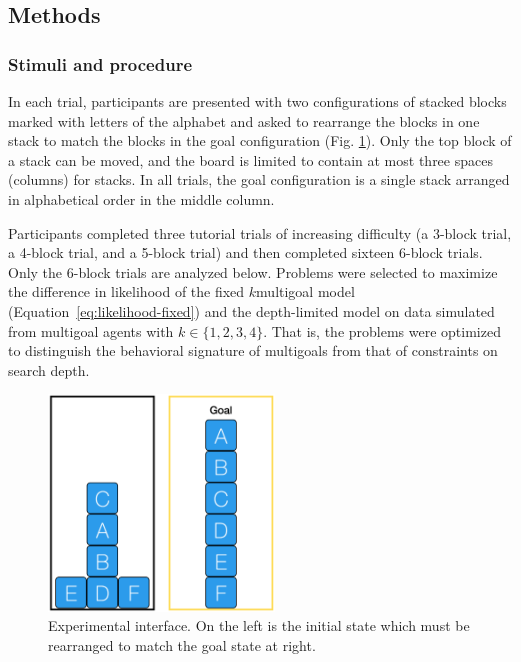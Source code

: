 \documentclass[10pt,letterpaper]{article}
\newcommand{\todo}[1]{\textcolor{red}{\textsc{[TODO: #1]}}}
\begin{document}




\subsection{Methods}
\subsubsection{Stimuli and procedure}

In each trial, participants are presented with two configurations of stacked blocks marked with letters of the alphabet and asked to rearrange the blocks in one stack to match the blocks in the goal configuration (Fig. \ref{fig:ui}). Only the top block of a stack can be moved, and the board is limited to contain at most three spaces (columns) for stacks. In all trials, the goal configuration is a single stack arranged in alphabetical order in the middle column.

Participants completed three tutorial trials of increasing difficulty (a 3-block trial, a 4-block trial, and a 5-block trial) and then completed sixteen 6-block trials. Only the 6-block trials are analyzed below. Problems were selected to maximize the difference in likelihood of the fixed $k$multigoal model (Equation~\ref{eq:likelihood-fixed}) and the depth-limited model on data simulated from multigoal agents with $k \in \{ 1,2,3,4 \}$. That is, the problems were optimized to distinguish the behavioral signature of multigoals from that of constraints on search depth.

\begin{figure}[t!]
    \centering
    \includegraphics[width=6cm]{example-block-world.png}
    \caption{Experimental interface. On the left is the initial state which must be rearranged to match the goal state at right.}
    \label{fig:ui}
\end{figure}
\end{document}
